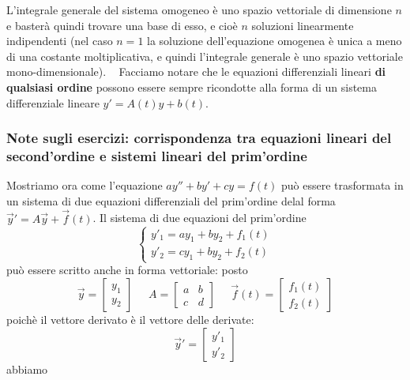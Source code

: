 L'integrale generale del sistema omogeneo è uno spazio vettoriale di dimensione $n$ e basterà quindi trovare una base di esso, e cioè $n$ soluzioni linearmente indipendenti (nel caso $n = 1$ la soluzione dell'equazione omogenea  è unica a meno di una costante moltiplicativa, e quindi l'integrale generale è uno spazio vettoriale mono-dimensionale).
\ \newline
\newline
Facciamo notare che le equazioni differenziali lineari \textbf{di qualsiasi ordine} possono essere sempre ricondotte alla forma di un sistema differenziale lineare $y' = A(t)y + b(t)$.
\subsubsection{Note sugli esercizi: corrispondenza tra equazioni lineari del second'ordine e sistemi lineari del prim'ordine}
Mostriamo ora come l'equazione $a y'' + by' + cy = f(t)$ può essere trasformata in un sistema di due equazioni differenziali del prim'ordine delal forma $\vec{y}' = A \vec{y} + \vec{f}(t)$.\newline
\newline
Il sistema di due equazioni del prim'ordine 
\[
    \begin{cases}
        y'_1 = ay_1 + by_2 + f_1(t)\\
        y'_2 = cy_1 + by_2 + f_2(t)
    \end{cases}
\]
può essere scritto anche in forma vettoriale: posto
\[
    \vec{y} = \left[\begin{matrix}
        y_1\\y_2        
    \end{matrix}\right] \;\;\;\;\; A = \left[\begin{matrix}
        a & b \\ c & d
    \end{matrix}\right] \;\;\;\;\; \vec{f}(t) = \left[\begin{matrix}
        f_1(t)\\f_2(t)
    \end{matrix}\right]
\]
poichè il vettore derivato è il vettore delle derivate:
\[
    \vec{y}' = \left[\begin{matrix}
        y'_1\\y'_2
    \end{matrix}\right]
\]
abbiamo
